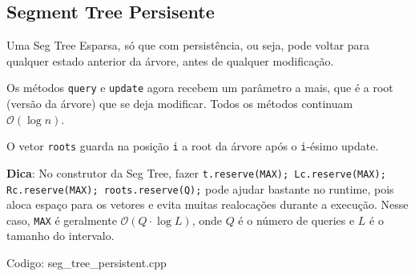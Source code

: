 \documentclass[10pt, a4paper, oneside]{book}
\begin{document}
\subsection{Segment Tree Persisente}


Uma Seg Tree Esparsa, só que com persistência, ou seja, pode voltar para qualquer estado anterior da árvore, antes de qualquer modificação.



Os métodos \texttt{query} e \texttt{update} agora recebem um parâmetro a mais, que é a root (versão da árvore) que se deja modificar. Todos os métodos continuam $\mathcal{O}(\log n)$.



O vetor \texttt{roots} guarda na posição \texttt{i} a root da árvore após o \texttt{i}-ésimo update.



\textbf{Dica}: No construtor da Seg Tree, fazer \texttt{t.reserve(MAX); Lc.reserve(MAX); Rc.reserve(MAX); roots.reserve(Q);} pode ajudar bastante no runtime, pois aloca espaço para os vetores e evita muitas realocações durante a execução. Nesse caso, \texttt{MAX} é geralmente $\mathcal{O}(Q \cdot \log L)$, onde $Q$ é o número de queries e $L$ é o tamanho do intervalo.
\hfill

Codigo: seg\_tree\_persistent.cpp
\end{document}
